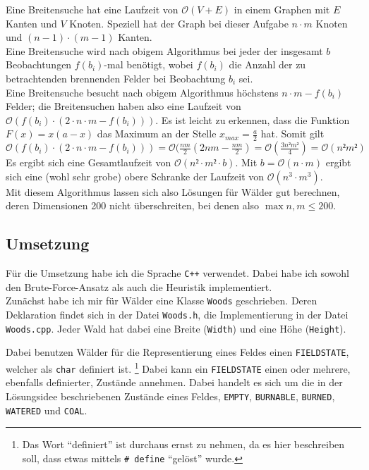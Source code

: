 Eine Breitensuche hat eine Laufzeit von $\mathcal{O}(V + E)$ in einem Graphen mit $E$ Kanten und $V$ Knoten. Speziell hat der Graph bei dieser Aufgabe $n\cdot m$ Knoten und $(n-1)\cdot (m-1)$ Kanten.\\
Eine Breitensuche wird nach obigem Algorithmus bei jeder der insgesamt $b$ Beobachtungen $f(b_i)$-mal benötigt, wobei $f(b_i)$ die Anzahl der zu betrachtenden brennenden Felder bei Beobachtung $b_i$ sei.\\
Eine Breitensuche besucht nach obigem Algorithmus höchstens $n\cdot m - f(b_i)$ Felder; die Breitensuchen haben also eine Laufzeit von $\mathcal{O}(f(b_i)\cdot (2\cdot n\cdot m - f(b_i)))$. Es ist leicht zu erkennen, dass die Funktion $F(x) = x(a-x)$ das Maximum an der Stelle $x_{max} = \frac{a}{2}$ hat. Somit gilt $\mathcal{O}(f(b_i)\cdot (2\cdot n\cdot m - f(b_i))) = \mathcal{O}(\frac{nm}{2}(2nm - \frac{nm}{2}) = \mathcal{O}(\frac{3n²m²}{4}) = \mathcal{O}(n²m²)$
 Es ergibt sich eine Gesamtlaufzeit von $\mathcal{O}(n²\cdot m² \cdot b)$. Mit $b = \mathcal{O}(n\cdot m)$ ergibt sich eine (wohl sehr grobe) obere Schranke der Laufzeit von $\mathcal{O}(n^3 \cdot m^3)$.\\
Mit diesem Algorithmus lassen sich also Lösungen für Wälder gut berechnen, deren Dimensionen 200 nicht überschreiten, bei denen also $\max{n,m} \leq 200$.

\subsection{Umsetzung}
Für die Umsetzung habe ich die Sprache \texttt{C++} verwendet. Dabei habe ich sowohl den Brute-Force-Ansatz als auch die Heuristik implementiert.\\
Zunächst habe ich mir für Wälder eine Klasse \texttt{Woods} geschrieben. Deren Deklaration findet sich in der Datei \texttt{Woods.h}, die Implementierung in der Datei \texttt{Woods.cpp}. Jeder Wald hat dabei eine Breite (\texttt{Width}) und eine Höhe (\texttt{Height}).

Dabei benutzen Wälder für die Representierung eines Feldes einen \texttt{FIELDSTATE}, welcher als \texttt{char} definiert ist. \footnote{Das Wort \enquote{definiert} ist durchaus ernst zu nehmen, da es hier beschreiben soll, dass etwas mittels \texttt{\# define} \enquote{gelöst} wurde.} Dabei kann ein \texttt{FIELDSTATE} einen oder mehrere, ebenfalls definierter, Zustände annehmen. Dabei handelt es sich um die in der Lösungsidee beschriebenen Zustände eines Feldes, \texttt{EMPTY}, \texttt{BURNABLE}, \texttt{BURNED}, \texttt{WATERED} und \texttt{COAL}.\\

